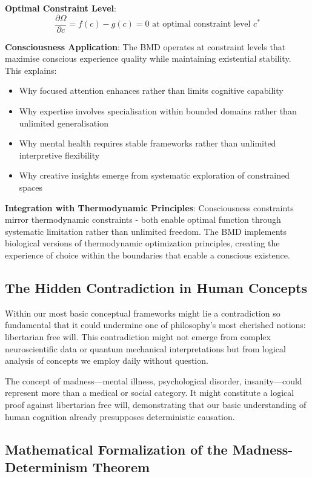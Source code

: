 \documentclass[12pt]{article}
\begin{document}
\textbf{Optimal Constraint Level}: 
$$\frac{\partial\Omega}{\partial c} = f(c) - g(c) = 0 \text{ at optimal constraint level } c^*$$

\textbf{Consciousness Application}: The BMD operates at constraint levels that maximise conscious experience quality while maintaining existential stability. This explains:
\begin{itemize}
\item Why focused attention enhances rather than limits cognitive capability
\item Why expertise involves specialisation within bounded domains rather than unlimited generalisation
\item Why mental health requires stable frameworks rather than unlimited interpretive flexibility
\item Why creative insights emerge from systematic exploration of constrained spaces
\end{itemize}

\textbf{Integration with Thermodynamic Principles}: Consciousness constraints mirror thermodynamic constraints - both enable optimal function through systematic limitation rather than unlimited freedom. The BMD implements biological versions of thermodynamic optimization principles, creating the experience of choice within the boundaries that enable a conscious existence.

\subsection{The Hidden Contradiction in Human Concepts}

Within our most basic conceptual frameworks might lie a contradiction so fundamental that it could undermine one of philosophy's most cherished notions: libertarian free will. This contradiction might not emerge from complex neuroscientific data or quantum mechanical interpretations but from logical analysis of concepts we employ daily without question.

The concept of madness—mental illness, psychological disorder, insanity—could represent more than a medical or social category. It might constitute a logical proof against libertarian free will, demonstrating that our basic understanding of human cognition already presupposes deterministic causation.

\subsection{Mathematical Formalization of the Madness-Determinism Theorem}
\end{document}
